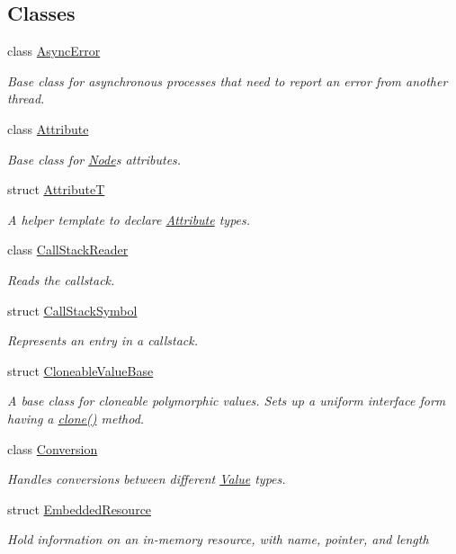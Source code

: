 \subsection*{Classes}
\begin{DoxyCompactItemize}
\item 
class \hyperlink{classdg_1_1deepcore_1_1_async_error}{Async\+Error}
\begin{DoxyCompactList}\small\item\em Base class for asynchronous processes that need to report an error from another thread. \end{DoxyCompactList}\item 
class \hyperlink{classdg_1_1deepcore_1_1_attribute}{Attribute}
\begin{DoxyCompactList}\small\item\em Base class for \hyperlink{classdg_1_1deepcore_1_1_node}{Node}\textquotesingle{}s attributes. \end{DoxyCompactList}\item 
struct \hyperlink{structdg_1_1deepcore_1_1_attribute_t}{AttributeT}
\begin{DoxyCompactList}\small\item\em A helper template to declare \hyperlink{classdg_1_1deepcore_1_1_attribute}{Attribute} types. \end{DoxyCompactList}\item 
class \hyperlink{classdg_1_1deepcore_1_1_call_stack_reader}{Call\+Stack\+Reader}
\begin{DoxyCompactList}\small\item\em Reads the callstack. \end{DoxyCompactList}\item 
struct \hyperlink{structdg_1_1deepcore_1_1_call_stack_symbol}{Call\+Stack\+Symbol}
\begin{DoxyCompactList}\small\item\em Represents an entry in a callstack. \end{DoxyCompactList}\item 
struct \hyperlink{structdg_1_1deepcore_1_1_cloneable_value_base}{Cloneable\+Value\+Base}
\begin{DoxyCompactList}\small\item\em A base class for cloneable polymorphic values. Sets up a uniform interface form having a {\ttfamily \hyperlink{structdg_1_1deepcore_1_1_cloneable_value_base_afa66af64c1335e01931f7919f0033730}{clone()}} method. \end{DoxyCompactList}\item 
class \hyperlink{classdg_1_1deepcore_1_1_conversion}{Conversion}
\begin{DoxyCompactList}\small\item\em Handles conversions between different \hyperlink{classdg_1_1deepcore_1_1_value}{Value} types. \end{DoxyCompactList}\item 
struct \hyperlink{structdg_1_1deepcore_1_1_embedded_resource}{Embedded\+Resource}
\begin{DoxyCompactList}\small\item\em Hold information on an in-\/memory resource, with name, pointer, and length


\end{DoxyCompactList}
\end{DoxyCompactItemize}
